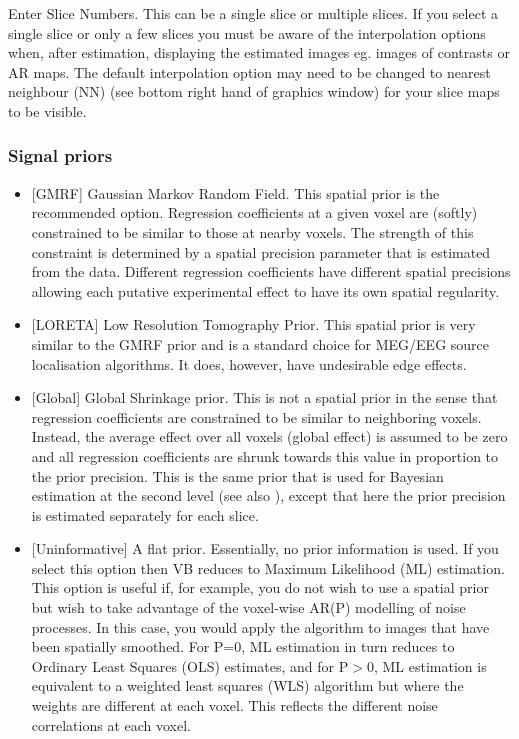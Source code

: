 Enter Slice Numbers. This can be a single slice or multiple slices. If you select a single slice or only a few slices you must be aware of the interpolation options when, after estimation, displaying the estimated images eg. images of contrasts or AR maps. The default interpolation option may need to be changed to nearest neighbour (NN) (see bottom right hand of graphics window) for your slice maps to be visible.

\subsubsection{Signal priors}

\begin{itemize}

\item{[GMRF] Gaussian Markov Random Field. This spatial prior is the recommended option. Regression coefficients at a given voxel are (softly) constrained to be similar to those at nearby voxels. The strength of this constraint is determined by a spatial precision parameter that is estimated from the data. Different regression coefficients have different spatial precisions allowing each putative experimental effect to have its own spatial regularity. }

\item{[LORETA] Low Resolution Tomography Prior. This spatial prior is very similar to the GMRF prior and is a standard choice for MEG/EEG source localisation algorithms. It does, however, have undesirable edge effects.}                                                                                                    

\item{[Global] Global Shrinkage prior. This is not a spatial prior in the sense that regression coefficients are constrained to be similar to neighboring voxels. Instead, the average effect over all voxels (global effect) is assumed to be zero and all regression coefficients are shrunk towards this value in proportion to the prior precision. This is the same prior that is used for Bayesian estimation at the second level (see also \cite{karl_posterior}), except that here the prior precision is estimated separately for each slice. }

\item{[Uninformative] A flat prior. Essentially, no prior information is used. If you select this option then VB reduces to Maximum Likelihood (ML) estimation. This option is useful if, for example, you do not wish to use a spatial prior but wish to take advantage of the voxel-wise AR(P) modelling of noise processes. In this case, you would apply the algorithm to images that have been spatially smoothed. For P=0, ML estimation in turn reduces to Ordinary Least Squares (OLS) estimates, and for P$>$0, ML estimation is equivalent to a weighted least squares (WLS) algorithm but where the weights are different at each voxel. This reflects the different noise correlations at each voxel. }

\end{itemize}

